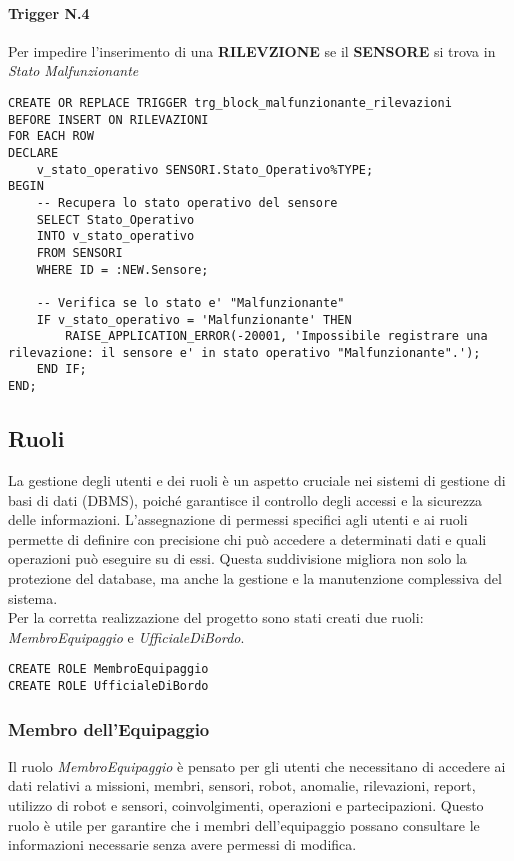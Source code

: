 \paragraph{Trigger N.4} Per impedire l'inserimento di una \textbf{RILEVZIONE} se il \textbf{SENSORE} si trova in \textit{Stato} \textit{Malfunzionante}
\begin{lstlisting}
CREATE OR REPLACE TRIGGER trg_block_malfunzionante_rilevazioni
BEFORE INSERT ON RILEVAZIONI
FOR EACH ROW
DECLARE
    v_stato_operativo SENSORI.Stato_Operativo%TYPE;
BEGIN
    -- Recupera lo stato operativo del sensore
    SELECT Stato_Operativo
    INTO v_stato_operativo
    FROM SENSORI
    WHERE ID = :NEW.Sensore;

    -- Verifica se lo stato e' "Malfunzionante"
    IF v_stato_operativo = 'Malfunzionante' THEN
        RAISE_APPLICATION_ERROR(-20001, 'Impossibile registrare una rilevazione: il sensore e' in stato operativo "Malfunzionante".');
    END IF;
END;
\end{lstlisting}

\subsection{Ruoli}
La gestione degli utenti e dei ruoli è un aspetto cruciale nei sistemi di gestione di basi di dati (DBMS), poiché garantisce il controllo degli accessi e la sicurezza delle informazioni. L'assegnazione di permessi specifici agli utenti e ai ruoli permette di definire con precisione chi può accedere a determinati dati e quali operazioni può eseguire su di essi. Questa suddivisione migliora non solo la protezione del database, ma anche la gestione e la manutenzione complessiva del sistema. \\

\noindent
Per la corretta realizzazione del progetto sono stati creati due ruoli: \textit{MembroEquipaggio} e \textit{UfficialeDiBordo}.
\begin{lstlisting}
CREATE ROLE MembroEquipaggio
CREATE ROLE UfficialeDiBordo
\end{lstlisting}

\subsubsection{Membro dell'Equipaggio}
Il ruolo \textit{MembroEquipaggio} è pensato per gli utenti che necessitano di accedere ai dati relativi a missioni, membri, sensori, robot, anomalie, rilevazioni, report, utilizzo di robot e sensori, coinvolgimenti, operazioni e partecipazioni.
Questo ruolo è utile per garantire che i membri dell'equipaggio possano consultare le informazioni necessarie senza avere permessi di modifica.

